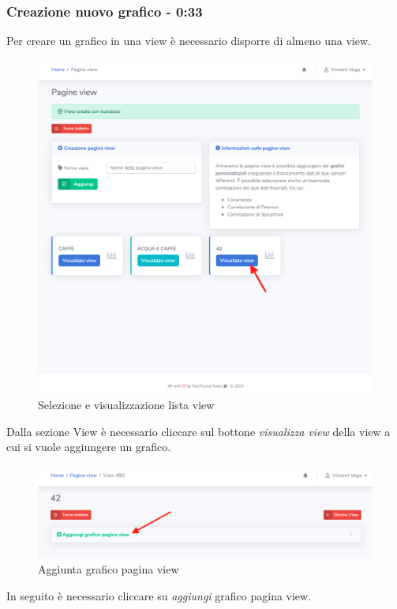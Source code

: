 	\subsubsection{Creazione nuovo grafico - 0:33}
		Per creare un grafico in una view è necessario disporre di almeno una view.
		\begin{figure}[H]
		\centering
		\includegraphics[scale=0.400]{res/images/membro/selView.png}
		\caption{Selezione e visualizzazione lista view}
	\end{figure}
		Dalla sezione View è necessario cliccare sul bottone \textit{visualizza view} della view a cui si vuole aggiungere un grafico.
		\begin{figure}[H]
		\centering
		\includegraphics[scale=0.450]{res/images/membro/clicAggGrafico.png}
		\caption{Aggiunta grafico pagina view}
	\end{figure}
		In seguito è necessario cliccare su \textit{aggiungi} grafico pagina view. 
